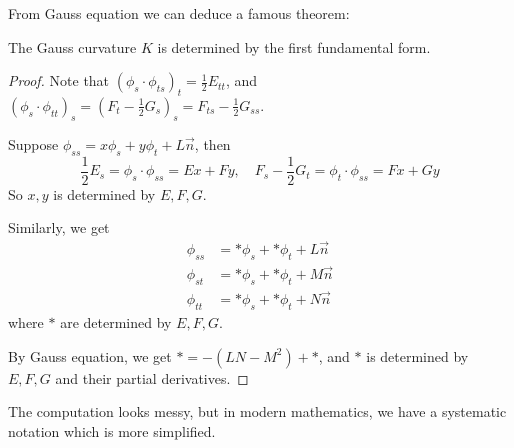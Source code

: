 From Gauss equation we can deduce a famous theorem:
\begin{theorem}
    The Gauss curvature $K$ is determined by the first fundamental form.
\end{theorem}
\begin{proof}[Proof]
    Note that $(\phi_s\cdot \phi_{ts})_t = \frac{1}{2}E_{tt}$, and
	$(\phi_s\cdot \phi_{tt})_s = (F_t - \frac{1}{2}G_s)_s = F_{ts} - \frac{1}{2}G_{ss}$.

	Suppose $\phi_{ss} = x\phi_s + y\phi_t + L\vec{n}$,
	then
	\[
		\frac{1}{2}E_s = \phi_s\cdot \phi_{ss} = Ex + Fy,\quad
		F_s - \frac{1}{2}G_t = \phi_t\cdot \phi_{ss} = Fx + Gy
	\]
	So $x,y$ is determined by $E,F,G$.

	Similarly, we get
	\[
	\begin{aligned}
		\phi_{ss} &= *\phi_s + *\phi_t + L\vec{n}\\
		\phi_{st} &= *\phi_s + *\phi_t + M\vec{n}\\
		\phi_{tt} &= *\phi_s + *\phi_t + N\vec{n}
	\end{aligned}
	\]
	where $*$ are determined by $E,F,G$.

	By Gauss equation, we get $* = -(LN - M^2) + *$,
	and $*$ is determined by $E,F,G$ and their partial derivatives.
\end{proof}
\begin{remark}
    The computation looks messy, but in modern mathematics,
	we have a systematic notation which is more simplified.
\end{remark}
